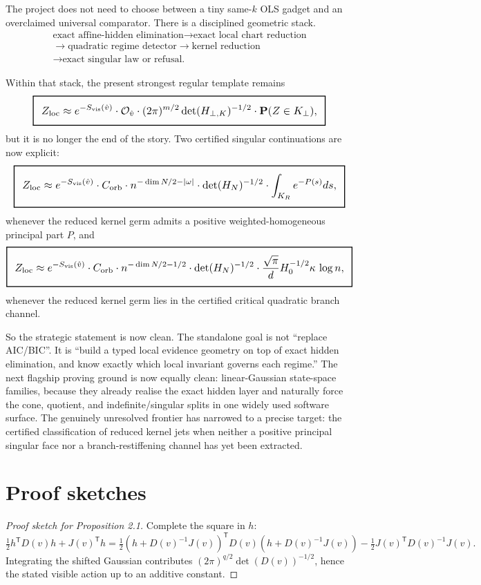 \documentclass[11pt,a4paper]{article}
\numberwithin{equation}{section}
\newcommand{\Prob}{\mathbf P}
\newcommand{\geomboxed}[1]{%
  \setlength{\fboxsep}{8pt}%
  \setlength{\fboxrule}{0.9pt}%
  \fbox{\scalebox{1.12}{$\displaystyle #1$}}%
}
\theoremstyle{thmcompact}
\theoremstyle{remark}
\begin{document}
The project does not need to choose between a tiny same-$k$ OLS gadget and an overclaimed universal comparator. There is a disciplined geometric stack.
\[
\begin{gathered}
\text{exact affine-hidden elimination}
\longrightarrow
\text{exact local chart reduction}\\
\longrightarrow
\text{quadratic regime detector}
\longrightarrow
\text{kernel reduction}\\
\longrightarrow
\text{exact singular law or refusal.}
\end{gathered}
\]

Within that stack, the present strongest regular template remains
\[
\geomboxed{
Z_{\mathrm{loc}}
\approx
 e^{-S_{\mathrm{vis}}(\hat v)}
\cdot \mathcal O_{\hat v}
\cdot (2\pi)^{m/2}
\det(H_{\perp,K})^{-1/2}
\cdot \Prob(Z\in K_{\perp}),}
\]
but it is no longer the end of the story. Two certified singular continuations are now explicit:
\[
\geomboxed{
Z_{\mathrm{loc}}
\approx
 e^{-S_{\mathrm{vis}}(\hat v)}
\cdot C_{\mathrm{orb}}
\cdot n^{-\dim N/2-|\omega|}
\cdot
\det(H_N)^{-1/2}
\cdot
\int_{K_R} e^{-P(s)}ds,}
\]
whenever the reduced kernel germ admits a positive weighted-homogeneous principal part $P$, and
\[
\geomboxed{
Z_{\mathrm{loc}}
\approx
 e^{-S_{\mathrm{vis}}(\hat v)}
\cdot C_{\mathrm{orb}}
\cdot n^{-\dim N/2-1/2}
\cdot
\det(H_N)^{-1/2}
\cdot
\frac{\sqrt{\pi}}{d}H_0^{-1/2}\kappa\,\log n,}
\]
whenever the reduced kernel germ lies in the certified critical quadratic branch channel.

So the strategic statement is now clean. The standalone goal is not ``replace AIC/BIC''. It is ``build a typed local evidence geometry on top of exact hidden elimination, and know exactly which local invariant governs each regime.'' The next flagship proving ground is now equally clean: linear-Gaussian state-space families, because they already realise the exact hidden layer and naturally force the cone, quotient, and indefinite/singular splits in one widely used software surface. The genuinely unresolved frontier has narrowed to a precise target: the certified classification of reduced kernel jets when neither a positive principal singular face nor a branch-restiffening channel has yet been extracted.

\appendix
\section{Proof sketches}

\begin{proof}[Proof sketch for Proposition 2.1]
Complete the square in $h$:
\[
\tfrac12 h^{\mathsf T}D(v)h + J(v)^{\mathsf T}h
=
\tfrac12 (h+D(v)^{-1}J(v))^{\mathsf T}D(v)(h+D(v)^{-1}J(v))
-
\tfrac12 J(v)^{\mathsf T}D(v)^{-1}J(v).
\]
Integrating the shifted Gaussian contributes $(2\pi)^{q/2}\det(D(v))^{-1/2}$, hence the stated visible action up to an additive constant.
\end{proof}
\end{document}
